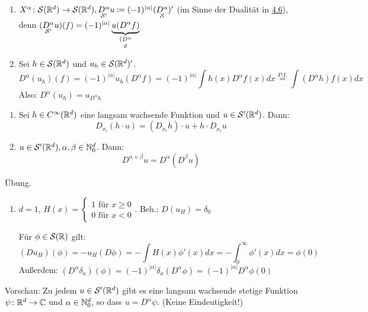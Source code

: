 \begin{bemerkung}
	\begin{enumerate}
		\item $X^{\alpha} \colon \mathcal{S}(\mathbb{R}^{d}) \rightarrow \mathcal{S}(\mathbb{R}^{d}), \underset{\mathcal{S}'}{D^{\alpha}} u \coloneqq (-1)^{|\alpha|} (\underset{\mathcal{S}}{D^{\alpha}})'$ (im Sinne der Dualität in \hyperref[def:4.6]{4.6}), denn $(\underset{\mathcal{S}'}{D^{\alpha}}u)(f) = (-1)^{|\alpha|}\underbrace{u(D^{\alpha}f)}_{\underset{\mathcal{S}}{(D^{\alpha}}}$
		\item Sei $h \in \mathcal{S}(\mathbb{R}^{d})$ und $u_{h} \in \mathcal{S}(\mathbb{R}^{d})'$.
			\[ D^{\alpha}(u_{h})(f) = (-1)^{|\alpha|} u_{h}(D^{\alpha}f) = (-1)^{|\alpha|} \int h(x) D^{\alpha}f(x) dx \overset{P.I.}{=} \int (D^{\alpha}h)f(x)dx \]
			Also: $\boxed{D^{\alpha}(u_{h}) = u_{D^{\alpha}h}}$ 
	\end{enumerate}
\end{bemerkung}
 

\begin{prop}
	\begin{enumerate}
		\item Sei $h \in C^{\infty}(\mathbb{R}^{d})$ eine langsam wachsende Funktion und $u \in \mathcal{S}'(\mathbb{R}^{d})$. Dann:
			\[ D_{x_{i}}(h \cdot u) = (D_{x_{i}}h)\cdot u + h \cdot D_{x_{i}}u \]
		\item $u \in \mathcal{S}'(\mathbb{R}^{d}), \alpha, \beta \in \mathbb{N}_{0}^{d}$. Dann:
			\[ D^{\alpha + \beta} u = D^{\alpha} (D^{\beta} u) \]
	\end{enumerate}	
\end{prop}

\begin{beweis}
	Übung.
\end{beweis}
 

\begin{beispiel}
	\begin{enumerate}
		\item $d = 1$, $H(x) = \begin{cases}
			1 \text{ für } x \geq 0 \\ 0 \text{ für } x < 0 \end{cases}$. Beh.: $D(u_{H}) = \delta_{0}$ \\
			\begin{beweis}
				Für $\phi \in \mathcal{S}(\mathbb{R})$ gilt:
					\[ (D u_{H})(\phi) = - u_{H}(D\phi) = - \int H(x) \phi'(x) dx = - \int_{0}^{\infty} \phi'(x) dx = \phi(0) \]
				Au{\ss}erdem: $(D^{\alpha}\delta_{a})(\phi) = (-1)^{|\alpha|}\delta_{a}(D^{\alpha}\phi) = (-1)^{|\alpha|} D^{\alpha} \phi(0)$
			\end{beweis} 
	\end{enumerate}
\end{beispiel}
 

Vorschau: Zu jedem $u \in \mathcal{S}'(\mathbb{R}^{d})$ gibt es eine langsam wachsende stetige Funktion $\psi \colon \mathbb{R}^{d} \rightarrow \mathbb{C}$ und $\alpha \in \mathbb{N}_{0}^{d}$, so dass $u = D^{\alpha} \psi$. (Keine Eindeutigkeit!)
 
 
 
\newpage
